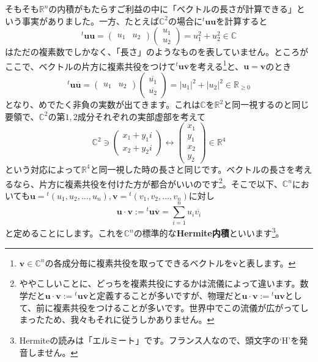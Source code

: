 そもそも$\mathbb{R}^n$の内積がもたらすご利益の中に「ベクトルの長さが計算できる」という事実がありました。一方、たとえば$\mathbb{C}^2$の場合に${}^t\bm{u} \bm{u}$を計算すると
\[
{}^t\bm{u} \bm{u} = 
\begin{pmatrix}
u_1 & u_2
\end{pmatrix}
\begin{pmatrix}
u_1 \\
u_2
\end{pmatrix}
= u_1^2 + u_2^2 \in \mathbb{C}
\]
はただの複素数でしかなく、「長さ」のようなものを表していません。ところがここで、ベクトルの片方に複素共役をつけて${}^t\bm{u}\overline{\bm{v}}$を考える\footnote{$\bm{v}\in\mathbb{C}^n$の各成分毎に複素共役を取ってできるベクトルを$\overline{\bm{v}}$と表します。}と、$\bm{u} = \bm{v}$のとき
\[
{}^t\bm{u}\overline{\bm{u}}
=
\begin{pmatrix}
u_1 & u_2
\end{pmatrix}
\begin{pmatrix}
\overline{u_1} \\
\overline{u_2}
\end{pmatrix}
= |u_1|^2 + |u_2|^2 \in \mathbb{R}_{\geq 0}
\]
となり、めでたく非負の実数が出てきます。これは$\mathbb{C}$を$\mathbb{R}^2$と同一視するのと同じ要領で、$\mathbb{C}^2$の第$1, 2$成分それぞれの実部虚部を考えて
\[
\mathbb{C}^2 \ni
\begin{pmatrix}
x_1 + y_1 i \\
x_2 + y_2 i
\end{pmatrix}
\longleftrightarrow
\begin{pmatrix}
x_1 \\
y_1 \\
x_2 \\
y_2
\end{pmatrix}
\in \mathbb{R}^4
\]
という対応によって$\mathbb{R}^4$と同一視した時の長さと同じです。ベクトルの長さを考えるなら、片方に複素共役を付けた方が都合がいいのです\footnote{ややこしいことに、どっちを複素共役にするかは流儀によって違います。数学だと$\bm{u} \cdot \bm{v} := {}^t\bm{u} \overline{\bm{v}}$と定義することが多いですが、物理だと$\bm{u} \cdot \bm{v} := \overline{{}^t\bm{u}}\bm{v}$として、前に複素共役をつけることが多いです。世界中でこの流儀が広がってしまったため、我々もそれに従うしかありません。}。そこで以下、$\mathbb{C}^n$においても$\bm{u} = {}^t(u_1, u_2, \ldots, u_n), \bm{v} = {}^t(v_1, v_2 ,\ldots, v_n)$に対し
\[
\bm{u} \cdot \bm{v} := {}^t\bm{u} \overline{\bm{v}} = \sum_{i = 1}^n u_i \overline{v_i}
\]
と定めることにします。これを$\mathbb{C}^n$の標準的な\textbf{Hermite内積}といいます\footnote{Hermiteの読みは「エルミート」です。フランス人なので、頭文字の`H'を発音しません。}。

